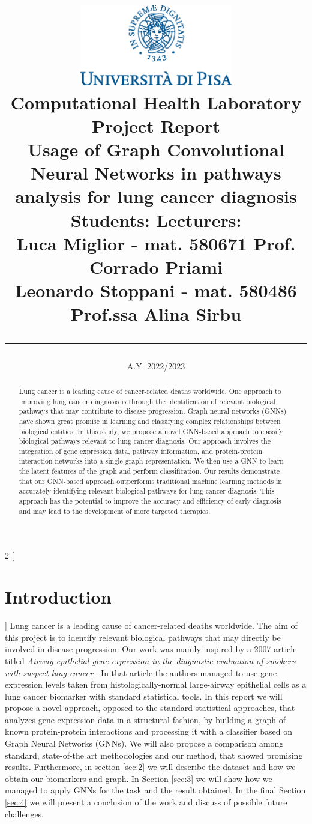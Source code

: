 \documentclass{article}
\title{
    \includegraphics[width=0.5\textwidth]{assets/marchio_unipi_pant541.eps}\\[1cm]
    {\Large Computational Health Laboratory Project Report}\\[2cm]
    {\Large \textbf{Usage of Graph Convolutional Neural Networks in pathways analysis for lung cancer diagnosis}}\\[3cm]
    \large
    \noindent \textbf{Students:} \hfill \textbf{Lecturers:}\\[1ex]
    \noindent Luca Miglior - mat. 580671 \hfill Prof. Corrado Priami\\
    \noindent Leonardo Stoppani - mat. 580486 \hfill Prof.ssa Alina Sirbu \\
    \vspace{7cm} 
    \hrule
    \noindent
    \date{A.Y. 2022/2023}
}
\begin{document}
\maketitle
\thispagestyle{empty}
\vspace*{\fill}
\begin{abstract} 
Lung cancer is a leading cause of cancer-related deaths worldwide. One approach to improving lung cancer diagnosis is through the identification of relevant biological pathways that may contribute to disease progression. Graph neural networks (GNNs) have shown great promise in learning and classifying complex relationships between biological entities. In this study, we propose a novel GNN-based approach to classify biological pathways relevant to lung cancer diagnosis. Our approach involves the integration of gene expression data, pathway information, and protein-protein interaction networks into a single graph representation. We then use a GNN to learn the latent features of the graph and perform classification. Our results demonstrate that our GNN-based approach outperforms traditional machine learning methods in accurately identifying relevant biological pathways for lung cancer diagnosis. This approach has the potential to improve the accuracy and efficiency of early diagnosis and may lead to the development of more targeted therapies.
\end{abstract}
\vspace*{\fill}
\newpage

\tableofcontents
\newpage

\begin{multicols}{2}
[
\section{Introduction}
]
Lung cancer is a leading cause of cancer-related deaths worldwide. The aim of this project is to identify relevant biological pathways that may directly be involved in disease progression. 
Our work was mainly inspired by a 2007 article titled \textit{Airway epithelial gene expression in the diagnostic evaluation of smokers with suspect lung cancer} \cite{spira2007airway}. In that article the authors managed to use gene expression levels taken from histologically-normal large-airway epithelial cells as a lung cancer biomarker with standard statistical tools.
In this report we will propose a novel approach, opposed to the standard statistical approaches, that analyzes gene expression data in a structural fashion, by building a graph of known protein-protein interactions and processing it with a classifier based on Graph Neural Networks (GNNs). We will also propose a comparison among standard, state-of-the art methodologies and our method, that showed promising results. 
Furthermore, in section \ref{sec:2} we will describe the dataset and how we obtain our biomarkers and graph. In Section \ref{sec:3} we will show how we managed to apply GNNs for the task and the result obtained. In the final Section \ref{sec:4} we will present a conclusion of the work and discuss of possible future challenges.
\end{multicols}
\end{document}
